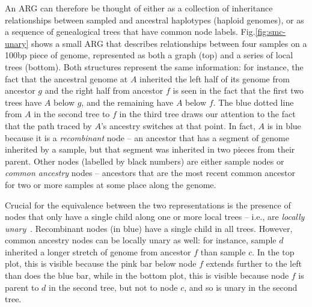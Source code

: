 \documentclass{article}
\begin{document}
An ARG can therefore be thought of either as a collection of inheritance
relationships between
sampled and ancestral haplotypes (haploid genomes), 
or as a sequence of genealogical trees that have common node labels.
Fig.\ref{fig:smc-unary} shows a small ARG
that describes relationships between four samples on a 100bp piece of genome,
represented as both a graph (top) and a series of local trees (bottom).
Both structures represent the same information:
for instance, the fact that the ancestral genome at $A$
inherited the left half of its genome from ancestor $g$
and the right half from ancestor $f$
is seen in the fact that the first two trees have $A$ below $g$,
and the remaining have $A$ below $f$.
The blue dotted line from $A$ in the second tree to $f$ in the third tree
draws our attention to the fact that
the path traced by $A$'s ancestry switches at that point.
In fact, $A$ is in blue because it is a \emph{recombinant}
node -- an ancestor that has a segment of genome inherited by a sample,
but that segment was inherited in two pieces from their parent.
Other nodes (labelled by black numbers) are either sample nodes
or \emph{common ancestry} nodes -- 
ancestors that are the most recent common ancestor for two
or more samples
at some place along the genome.

Crucial for the equivalence between the two representations is the presence of
nodes that only have a single child along one or more local trees --
i.e., are \emph{locally unary}~\citep{wong_general_2023}.
Recombinant nodes (in blue) have a single child in all trees.
However, common ancestry nodes can be locally unary as well:
for instance, sample $d$ inherited a longer stretch of genome from ancestor $f$
than sample $c$.
In the top plot, this is visible because the pink bar below node $f$
extends further to the left than does the blue bar,
while in the bottom plot, this is visible because node $f$ is parent to $d$
in the second tree, but not to node $c$, and so is unary
in the second tree. 
\end{document}
